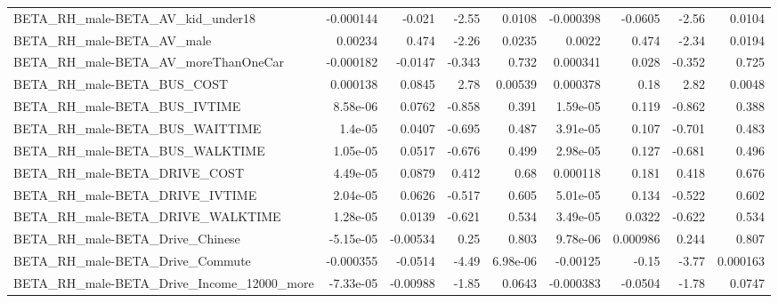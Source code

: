 \begin{tabular}{lrrrrrrrr}
BETA\_RH\_male-BETA\_AV\_kid\_under18                   &   -0.000144 &       -0.021 &    -2.55 &   0.0108 &  -0.000398 &     -0.0605 &        -2.56 &        0.0104 \\
BETA\_RH\_male-BETA\_AV\_male                          &     0.00234 &        0.474 &    -2.26 &   0.0235 &     0.0022 &       0.474 &        -2.34 &        0.0194 \\
BETA\_RH\_male-BETA\_AV\_moreThanOneCar                &   -0.000182 &      -0.0147 &   -0.343 &    0.732 &   0.000341 &       0.028 &       -0.352 &         0.725 \\
BETA\_RH\_male-BETA\_BUS\_COST                         &    0.000138 &       0.0845 &     2.78 &  0.00539 &   0.000378 &        0.18 &         2.82 &        0.0048 \\
BETA\_RH\_male-BETA\_BUS\_IVTIME                       &    8.58e-06 &       0.0762 &   -0.858 &    0.391 &   1.59e-05 &       0.119 &       -0.862 &         0.388 \\
BETA\_RH\_male-BETA\_BUS\_WAITTIME                     &     1.4e-05 &       0.0407 &   -0.695 &    0.487 &   3.91e-05 &       0.107 &       -0.701 &         0.483 \\
BETA\_RH\_male-BETA\_BUS\_WALKTIME                     &    1.05e-05 &       0.0517 &   -0.676 &    0.499 &   2.98e-05 &       0.127 &       -0.681 &         0.496 \\
BETA\_RH\_male-BETA\_DRIVE\_COST                       &    4.49e-05 &       0.0879 &    0.412 &     0.68 &   0.000118 &       0.181 &        0.418 &         0.676 \\
BETA\_RH\_male-BETA\_DRIVE\_IVTIME                     &    2.04e-05 &       0.0626 &   -0.517 &    0.605 &   5.01e-05 &       0.134 &       -0.522 &         0.602 \\
BETA\_RH\_male-BETA\_DRIVE\_WALKTIME                   &    1.28e-05 &       0.0139 &   -0.621 &    0.534 &   3.49e-05 &      0.0322 &       -0.622 &         0.534 \\
BETA\_RH\_male-BETA\_Drive\_Chinese                    &   -5.15e-05 &     -0.00534 &     0.25 &    0.803 &   9.78e-06 &    0.000986 &        0.244 &         0.807 \\
BETA\_RH\_male-BETA\_Drive\_Commute                    &   -0.000355 &      -0.0514 &    -4.49 & 6.98e-06 &   -0.00125 &       -0.15 &        -3.77 &      0.000163 \\
BETA\_RH\_male-BETA\_Drive\_Income\_12000\_more          &   -7.33e-05 &     -0.00988 &    -1.85 &   0.0643 &  -0.000383 &     -0.0504 &        -1.78 &        0.0747 \\

\end{tabular}
